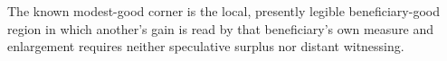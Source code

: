 \begin{definition}\PaperGradeGap{-2pt}
  The known modest-good corner is the local, presently legible beneficiary-good region in which another's gain is read by that beneficiary's own measure and enlargement requires neither speculative surplus nor distant witnessing.
\end{definition}
